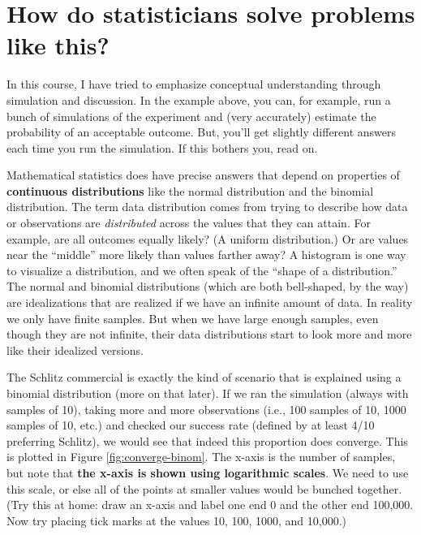 \documentclass[
  openany]{book}
\begin{document}
\hypertarget{how-do-statisticians-solve-problems-like-this}{%
\section*{How do statisticians solve problems like this?}\label{how-do-statisticians-solve-problems-like-this}}

In this course, I have tried to emphasize conceptual understanding through simulation and discussion. In the example above, you can, for example, run a bunch of simulations of the experiment and (very accurately) estimate the probability of an acceptable outcome. But, you'll get slightly different answers each time you run the simulation. If this bothers you, read on.

Mathematical statistics does have precise answers that depend on properties of \textbf{continuous distributions} like the normal distribution and the binomial distribution. The term data distribution comes from trying to describe how data or observations are \emph{distributed} across the values that they can attain. For example, are all outcomes equally likely? (A uniform distribution.) Or are values near the ``middle'' more likely than values farther away? A histogram is one way to visualize a distribution, and we often speak of the ``shape of a distribution.'' The normal and binomial distributions (which are both bell-shaped, by the way) are idealizations that are realized if we have an infinite amount of data. In reality we only have finite samples.
But when we have large enough samples, even though they are not infinite, their data distributions start to look more and more like their idealized versions.

The Schlitz commercial is exactly the kind of scenario that is explained using a binomial distribution (more on that later). If we ran the simulation (always with samples of 10), taking more and more observations (i.e., 100 samples of 10, 1000 samples of 10, etc.) and checked our success rate (defined by at least 4/10 preferring Schlitz), we would see that indeed this proportion does converge. This is plotted in Figure \ref{fig:converge-binom}. The x-axis is the number of samples, but note that \textbf{the x-axis is shown using logarithmic scales}. We need to use this scale, or else all of the points at smaller values would be bunched together. (Try this at home: draw an x-axis and label one end 0 and the other end 100,000. Now try placing tick marks at the values 10, 100, 1000, and 10,000.)
\end{document}
